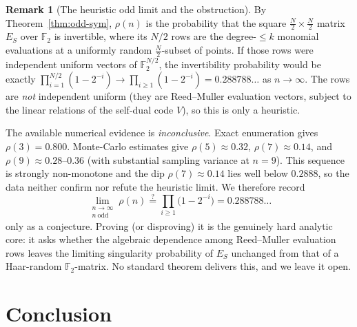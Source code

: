 \documentclass{amsart}
\theoremstyle{definition}
\newtheorem{remark}[theorem]{Remark}
\newcommand{\F}{\mathbb{F}}
\begin{document}
\begin{remark}[The heuristic odd limit and the obstruction]\label{rem:oddlimit}
By Theorem~\ref{thm:odd-sym}, $\rho(n)$ is the probability that the square
$\tfrac N2\times\tfrac N2$ matrix $E_S$ over $\F_2$ is invertible, where
its $N/2$ rows are the degree-$\le k$ monomial evaluations at a uniformly
random $\tfrac N2$-subset of points. If those rows were independent uniform
vectors of $\F_2^{N/2}$, the invertibility probability would be exactly
$\prod_{i=1}^{N/2}(1-2^{-i})\to\prod_{i\ge1}(1-2^{-i})=0.288788\ldots$ as
$n\to\infty$. The rows are \emph{not} independent uniform (they are
Reed--Muller evaluation vectors, subject to the linear relations of the
self-dual code $V$), so this is only a heuristic.

The available numerical evidence is \emph{inconclusive}. Exact enumeration
gives $\rho(3)=0.800$. Monte-Carlo estimates give
$\rho(5)\approx0.32$, $\rho(7)\approx0.14$, and $\rho(9)\approx0.28$--$0.36$
(with substantial sampling variance at $n=9$). This sequence is strongly
non-monotone and the dip $\rho(7)\approx0.14$ lies well below
$0.2888$, so the data neither confirm nor refute the heuristic limit. We
therefore record
\[
\lim_{\substack{n\to\infty\\ n\ \mathrm{odd}}}\rho(n)
\stackrel{?}{=}\prod_{i\ge1}\bigl(1-2^{-i}\bigr)=0.288788\ldots
\]
only as a conjecture. Proving (or disproving) it is the genuinely hard
analytic core: it asks whether the algebraic dependence among
Reed--Muller evaluation rows leaves the limiting singularity probability of
$E_S$ unchanged from that of a Haar-random $\F_2$-matrix. No standard
theorem delivers this, and we leave it open.
\end{remark}

\section{Conclusion}
\end{document}
